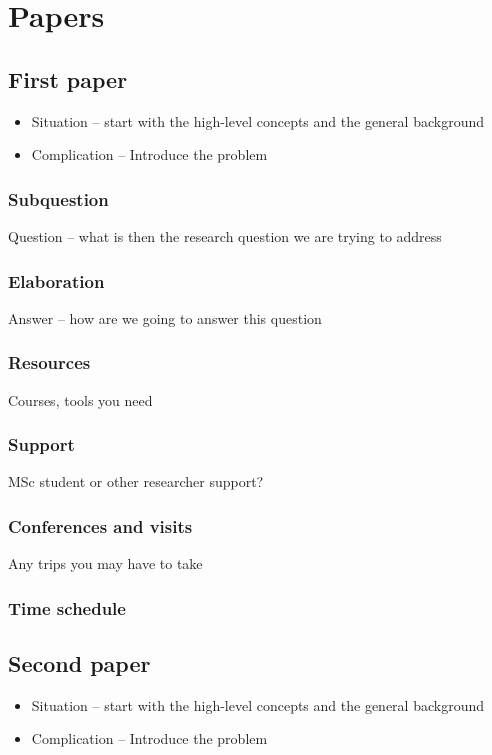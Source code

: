 \chapter{Papers}
\section{First paper}
\label{sec:2.1}
\begin{itemize}
	\item Situation – start with the high-level concepts and the general background
	\item Complication – Introduce the problem
\end{itemize}



\subsection{Subquestion}
Question – what is then the research question we are trying to address

\subsection{Elaboration}

Answer – how are we going to answer this question \\ \cite{2013US1}

\subsection{Resources}
Courses, tools you need

\subsection{Support}
MSc student or other researcher support?

\subsection{Conferences and visits}
Any trips you may have to take

\subsection{Time schedule}

\newpage
\section{Second paper}
\label{sec:2.2}
\begin{itemize}
	\item Situation – start with the high-level concepts and the general background
	\item Complication – Introduce the problem
\end{itemize}




